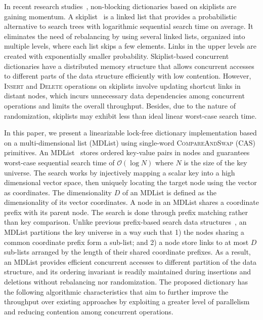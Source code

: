 \documentclass[10pt,conference,compsocconf]{IEEEtran}
\begin{document}
In recent research studies~\cite{linden2013skiplist,sundell2004scalable,fraser2004practical}, non-blocking dictionaries based on skiplists are gaining momentum.
A skiplist~\cite{pugh1990skip} is a linked list that provides a probabilistic alternative to search trees with logarithmic sequential search time on average. 
It eliminates the need of rebalancing by using several linked lists, organized into multiple levels, where each list skips a few elements. 
Links in the upper levels are created with exponentially smaller probability.
Skiplist-based concurrent dictionaries have a distributed memory structure that allows concurrent accesses to different parts of the data structure efficiently with low contention. 
However, \textsc{Insert} and \textsc{Delete} operations on skiplists involve updating shortcut links in distant nodes, which incurs unnecessary data dependencies among concurrent operations and limits the overall throughput.
Besides, due to the nature of randomization, skiplists may exhibit less than ideal linear worst-case search time.

In this paper, we present a linearizable lock-free dictionary implementation based on a multi-dimensional list (MDList) using single-word \textsc{CompareAndSwap} (CAS) primitives.
An MDList~\cite{zhang2015lockfree} stores ordered key-value pairs in nodes and guarantees worst-case sequential search time of $\mathcal{O}(\log N)$ where $N$ is the size of the key universe.
The search works by injectively mapping a scalar key into a high dimensional vector space, then uniquely locating the target node using the vector as coordinates.
The dimensionality $D$ of an MDList is defined as the dimensionality of its vector coordinates.
A node in an MDList shares a coordinate prefix with its parent node. 
The search is done through prefix matching rather than key comparison.
Unlike previous prefix-based search data structures~\cite{prokopec2012concurrent,oshman2013skiptrie}, an MDList partitions the key universe in a way such that 1) the nodes sharing a common coordinate prefix form a sub-list; and 2) a node store links to at most $D$ sub-lists arranged by the length of their shared coordinate prefixes.
As a result, an MDList provides efficient concurrent accesses to different partition of the data structure, and its ordering invariant is readily maintained during insertions and deletions without rebalancing nor randomization.
The proposed dictionary has the following algorithmic characteristics that aim to further improve the throughput over existing approaches by exploiting a greater level of parallelism and reducing contention among concurrent operations.
\end{document}
